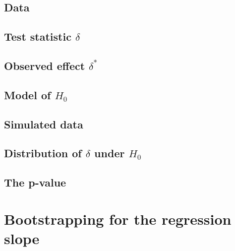 \documentclass[12pt, krantz2,]{krantz}
\begin{document}
\hypertarget{data-1}{%
\subsection{Data}\label{data-1}}

\hypertarget{test-statistic-delta-1}{%
\subsection{\texorpdfstring{Test statistic \(\delta\)}{Test statistic \textbackslash{}delta}}\label{test-statistic-delta-1}}

\hypertarget{observed-effect-delta-1}{%
\subsection{\texorpdfstring{Observed effect \(\delta^*\)}{Observed effect \textbackslash{}delta\^{}*}}\label{observed-effect-delta-1}}

\hypertarget{model-of-h_0-1}{%
\subsection{\texorpdfstring{Model of \(H_0\)}{Model of H\_0}}\label{model-of-h_0-1}}

\hypertarget{simulated-data-1}{%
\subsection{Simulated data}\label{simulated-data-1}}

\hypertarget{distribution-of-delta-under-h_0-1}{%
\subsection{\texorpdfstring{Distribution of \(\delta\) under \(H_0\)}{Distribution of \textbackslash{}delta under H\_0}}\label{distribution-of-delta-under-h_0-1}}

\hypertarget{the-p-value-1}{%
\subsection{The p-value}\label{the-p-value-1}}

\hypertarget{bootstrapping-for-the-regression-slope}{%
\section{Bootstrapping for the regression slope}\label{bootstrapping-for-the-regression-slope}}
\end{document}
